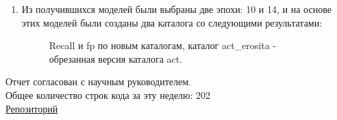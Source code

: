 \documentclass{article}
\begin{document}
\begin{enumerate}
    \item Из получившихся моделей были выбраны две эпохи: 10 и 14, и на основе этих моделей были 
        созданы два каталога со следующими результатами:\\
    \begin{figure}[h]
        \caption{Recall и fp по новым каталогам, каталог act\_erosita - обрезанная версия каталога 
        act.}
    \end{figure}


\end{enumerate}

Отчет согласован с научным руководителем.\\
Общее количество строк кода за эту неделю: 202\\
\hyperlink{https://github.com/rt2122/data-segmentation-2}{Репозиторий}\\ 
\end{document}
